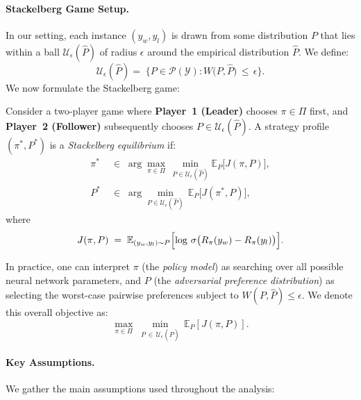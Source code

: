 \paragraph{Stackelberg Game Setup.}
In our setting, each instance \((y_w,y_l)\) is drawn from some distribution \(P\) that lies within a ball \(\mathcal{U}_\epsilon(\hat{P})\) of radius \(\epsilon\) around the empirical distribution \(\hat{P}\).  We define:
\[
\mathcal{U}_\epsilon(\hat{P}) 
=\; \bigl\{
    P \in \mathcal{P}(\mathcal{Y}) 
    : W\bigl(P,\hat{P}\bigr) \,\le\, \epsilon
  \bigr\}.
\]
We now formulate the Stackelberg game:

\begin{definition}
\label{def:stackelberg_equilibrium}
Consider a two-player game where \textbf{Player~1 (Leader)} chooses \(\pi\in\Pi\) first, and \textbf{Player~2 (Follower)} subsequently chooses \(P \in \mathcal{U}_\epsilon(\hat{P})\).  A strategy profile \((\pi^*,P^*)\) is a \emph{Stackelberg equilibrium} if:
\begin{align}
\pi^*
&\;\in\; 
\arg\max_{\pi \in \Pi}\,
\min_{P \in \mathcal{U}_\epsilon(\hat{P})} 
\mathbb{E}_{P}\bigl[J(\pi,P)\bigr],
\\[6pt]
P^*
&\;\in\; 
\arg\min_{P \in \mathcal{U}_\epsilon(\hat{P})}\,
\mathbb{E}_{P}\bigl[J(\pi^*,P)\bigr],
\end{align} 
where 
\[
J(\pi,P) \;=\; \mathbb{E}_{(y_w,y_l)\sim P}\Bigl[\log\,\sigma\bigl(R_{\pi}(y_w)-R_{\pi}(y_l)\bigr)\Bigr].
\]
\end{definition}

In practice, one can interpret \(\pi\) (the \emph{policy model}) as searching over all possible neural network parameters, and \(P\) (the \emph{adversarial preference distribution}) as selecting the worst-case pairwise preferences subject to \(W(P,\hat{P})\le \epsilon\).  We denote this overall objective as:
\begin{equation}
\label{eq:sgpo_obj}
\max_{\pi \in \Pi}\;
\min_{P \,\in\,\mathcal{U}_\epsilon(\hat{P})}
\, \mathbb{E}_{P}[J(\pi,P)].
\end{equation}

\paragraph{Key Assumptions.}
We gather the main assumptions used throughout the analysis:

